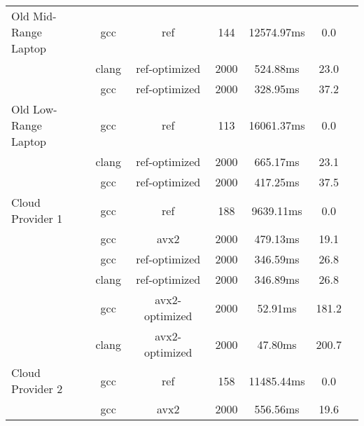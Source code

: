 \begin{table}
\begin{tabularx}{\linewidth}{X c c c c c c}
               \midrule
        \multirowcell{3}{Old Mid-Range\\ Laptop} &                  gcc &                  ref &                  144 &           12574.97ms &                  0.0\\
        &                clang &        ref-optimized &                 2000 &             524.88ms &                 23.0\\
        &                  gcc &        ref-optimized &                 2000 &             328.95ms &                 37.2\\
        \midrule
         \multirowcell{3}{Old Low-Range\\ Laptop} &                  gcc &                  ref &                  113 &           16061.37ms &                  0.0\\
        &                clang &        ref-optimized &                 2000 &             665.17ms &                 23.1\\
        &                  gcc &        ref-optimized &                 2000 &             417.25ms &                 37.5\\
        \midrule
            \multirowcell{6}{Cloud\\ Provider 1} &                  gcc &                  ref &                  188 &            9639.11ms &                  0.0\\
            &                  gcc &                 avx2 &                 2000 &             479.13ms &                 19.1\\
            &                  gcc &        ref-optimized &                 2000 &             346.59ms &                 26.8\\
            &                clang &        ref-optimized &                 2000 &             346.89ms &                 26.8\\
            &                  gcc &       avx2-optimized &                 2000 &              52.91ms &                181.2\\
            &                clang &       avx2-optimized &                 2000 &              47.80ms &                200.7\\
            \midrule
           \multirowcell{6}{Cloud\\ Provider 2}  &                  gcc &                  ref &                  158 &           11485.44ms &                  0.0\\
            &                  gcc &                 avx2 &                 2000 &             556.56ms &                 19.6\\

\end{tabularx}
\end{table}
